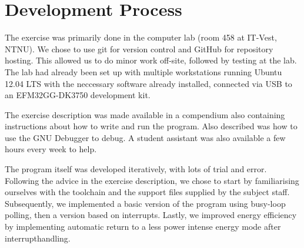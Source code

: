 \section{Development Process}

The exercise was primarily done in the computer lab (room 458 at IT-Vest, NTNU). We chose to use git for version control and GitHub for repository hosting. This allowed us to do minor work off-site, followed by testing at the lab.
The lab had already been set up with multiple workstations running Ubuntu 12.04 LTS with the neccessary software already installed, connected via USB to an EFM32GG-DK3750 development kit.

The exercise description was made available in a compendium also containing instructions about how to write and run the program. Also described was how to use the GNU Debugger to debug. A student assistant was also available a few hours every week to help.

The program itself was developed iteratively, with lots of trial and error. Following the advice in the exercise description, we chose to start by familiarising ourselves with the toolchain and the support files supplied by the subject staff. Subsequently, we implemented a basic version of the program using busy-loop polling, then a version based on interrupts. Lastly, we improved energy efficiency by implementing automatic return to a less power intense energy mode after interrupthandling.
